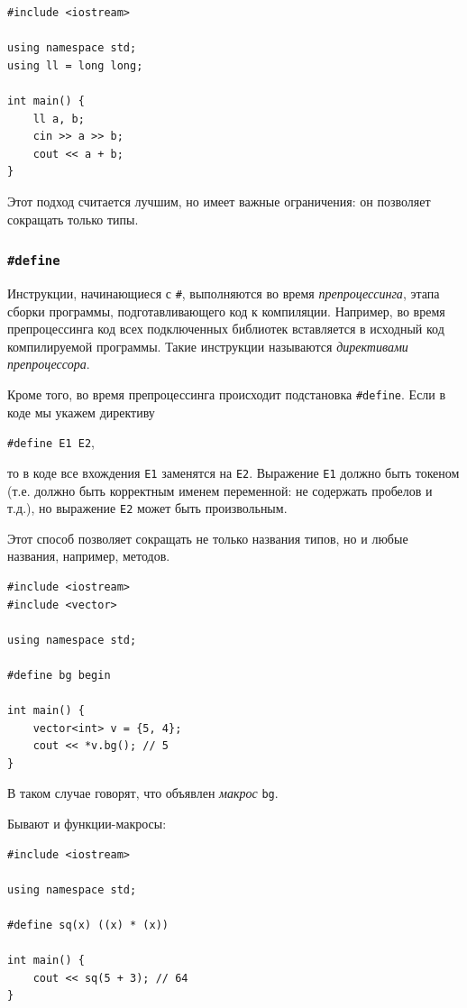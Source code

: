 \documentclass{article}
\begin{document}
	\begin{lstlisting}
#include <iostream>

using namespace std;
using ll = long long;

int main() {
	ll a, b;
	cin >> a >> b;
	cout << a + b;
}
	\end{lstlisting}

	Этот подход считается лучшим, но имеет важные ограничения: он позволяет сокращать только типы. 

	\subsubsection{\texttt{\#define}}
	\label{sec:defines}

	Инструкции, начинающиеся с \texttt{\#}, выполняются во время \textit{препроцессинга}, этапа сборки программы, подготавливающего код к компиляции. Например, во время препроцессинга код всех подключенных библиотек вставляется в исходный код компилируемой программы. Такие инструкции называются \textit{директивами препроцессора}.
	
	Кроме того, во время препроцессинга происходит подстановка \texttt{\#define}. Если в коде мы укажем директиву
	
	\begin{center}
		\texttt{\#define E1 E2},
	\end{center}
	
	то в коде все вхождения \texttt{E1} заменятся на \texttt{E2}. Выражение \texttt{E1} должно быть токеном (т.е. должно быть корректным именем переменной: не содержать пробелов и т.д.), но выражение \texttt{E2} может быть произвольным.
	
	Этот способ позволяет сокращать не только названия типов, но и любые названия, например, методов.

	\begin{lstlisting}
#include <iostream>
#include <vector>

using namespace std;

#define bg begin

int main() {
	vector<int> v = {5, 4};
	cout << *v.bg(); // 5
}
	\end{lstlisting}

	В таком случае говорят, что объявлен \textit{макрос} \texttt{bg}.
	
	Бывают и функции-макросы:

	\begin{lstlisting}
#include <iostream>

using namespace std;

#define sq(x) ((x) * (x))

int main() {
	cout << sq(5 + 3); // 64
}
	\end{lstlisting}
\end{document}
